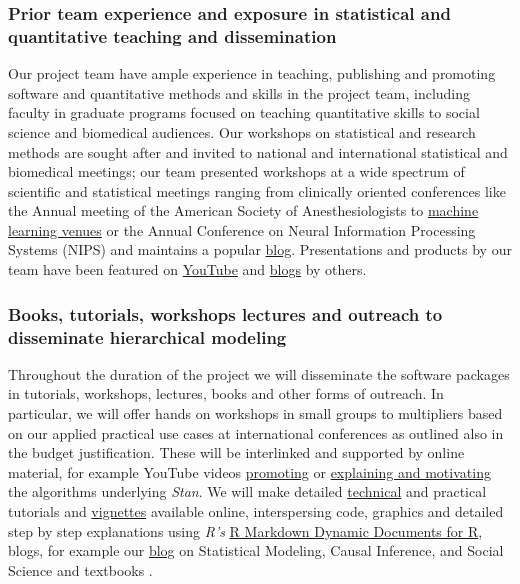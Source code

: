 \documentclass[11pt,notitlepage]{article}
\begin{document}
\subsubsection*{Prior team experience and exposure in statistical and quantitative teaching and dissemination}
Our project team have ample experience in teaching, publishing and promoting software and quantitative methods and skills in the project 
team, including faculty in graduate programs focused on teaching quantitative skills to social science and biomedical audiences. 
Our workshops on statistical and research methods are sought after and invited to national and international statistical and biomedical 
meetings; our team presented workshops at a wide spectrum of scientific and statistical meetings ranging from clinically oriented 
conferences like the Annual meeting of the American Society of Anesthesiologists to \href{https://www.youtube.com/watch?v=pHsuIaPbNbY}{machine learning venues} or the Annual Conference on Neural Information Processing Systems (NIPS) and maintains a popular \href{http://andrewgelman.com/}{blog}. Presentations and products by our team have been featured on \href{https://www.youtube.com/watch?v=X31xqNHcvQs}{YouTube} and \href{http://thinkinator.com/2016/01/12/r-users-will-now-inevitably-become-bayesians/}{blogs} by others.   

\subsubsection*{Books, tutorials, workshops lectures and outreach to disseminate hierarchical modeling}
Throughout the duration of the project we will disseminate the software packages in tutorials, workshops, lectures, books and other forms 
of outreach. In particular, we will offer hands on workshops in small groups to multipliers based on our applied practical use cases at 
international conferences as outlined also in the budget justification. These will be interlinked and supported by online material, for 
example YouTube videos \href{https://www.youtube.com/watch?v=pWow8Qe1snQ}{promoting} or 
\href{https://www.youtube.com/watch?v=pHsuIaPbNbY}{explaining and motivating} the algorithms underlying \textit{Stan}. We will make 
detailed \href{http://mc-stan.org/documentation/}{technical} and practical tutorials and 
\href{https://cran.r-project.org/web/packages/rstanarm/vignettes/aov.html}{vignettes} available online, interspersing code, graphics 
and detailed step by step explanations using \textit{R's}  \href{http://rmarkdown.rstudio.com/}{R Markdown \- Dynamic Documents for R}, 
blogs, for example our \href{http://andrewgelman.com/}{blog} on Statistical Modeling, Causal Inference, and Social Science and 
textbooks \cite{Gelman-Hill_2014}. 
\end{document}
